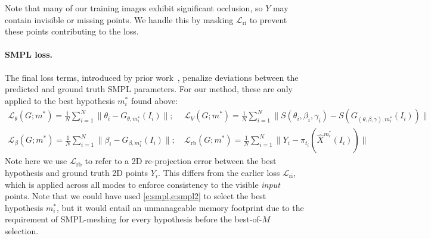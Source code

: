 Note that many of our training images exhibit significant occlusion, so $Y$ may contain invisible or missing points. We handle this by masking $\mathcal{L}_\text{ri}$ to prevent these points contributing to the loss.

\paragraph{SMPL loss.}
The final loss terms, introduced by prior work~\cite{kanazawa18learning,pavlakos18learning,kolotouros19learning}, penalize
deviations between the predicted and ground truth SMPL parameters.
For our method, these are only applied to the best hypothesis $m_i^*$ found above:
{\small
\begin{align}
\mathcal{L}_\theta(G;m^*) = \frac{1}{N}
  \sum_{i=1}^N \| \theta_i - G_{\theta,m_i^*}(I_i)\|; &~
\mathcal{L}_V(G;m^*) = \frac{1}{N} \label{e:smpl}
  \sum_{i=1}^N \| S(\theta_i,\beta_i,\gamma_i) - S(G_{(\theta,\beta,\gamma),m_i^*}(I_i))\| \\
\mathcal{L}_\beta(G;m^*) = \frac{1}{N}
  \sum_{i=1}^N \| \beta_i - G_{\beta,m_i^*}(I_i)\|; &~
\mathcal{L}_\text{rb}(G;m^*) = \frac{1}{N} \label{e:smpl2}
  \sum_{i=1}^N \| Y_i - \pi_{t_{i}}(\hat{X}^{m_i^*}(I_i))\|
\end{align}}%
Note here we use $\mathcal{L}_\text{rb}$ to refer to a 2D re-projection error between the best hypothesis and ground truth 2D points $Y_i$. This differs from the earlier loss $\mathcal{L}_\text{ri}$, which is applied across all modes to enforce consistency to the visible \emph{input} points. Note that we could have used \cref{e:smpl,e:smpl2} to select the best hypothesis $m_i^*$, but it would entail an unmanageable memory footprint due to the requirement of SMPL-meshing for every hypothesis before the best-of-$M$ selection.


